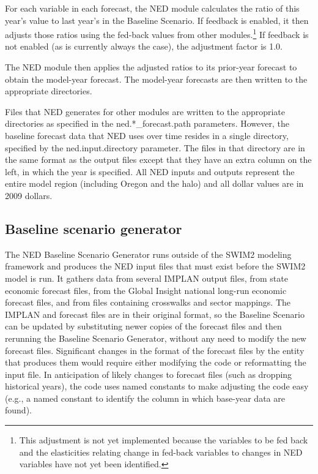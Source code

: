 For each variable in each forecast, the NED module calculates the ratio of this year's value to last year's in the Baseline Scenario. If feedback is enabled, it then adjusts those ratios using the fed-back values from other modules.\footnote{This adjustment is not yet implemented because the variables to be fed back and the elasticities relating change in fed-back variables to changes in NED variables have not yet been identified.} If feedback is not enabled (as is currently always the case), the adjustment factor is 1.0.

The NED module then applies the adjusted ratios to its prior-year forecast to obtain the model-year forecast. The model-year forecasts are then written to the appropriate directories.

Files that NED generates for other modules are written to the appropriate directories as specified in the ned.*\_forecast.path parameters. However, the baseline forecast data that NED uses over time resides in a single directory, specified by the ned.input.directory parameter. The files in that directory are in the same format as the output files except that they have an extra column on the left, in which the year is specified. All NED inputs and outputs represent the entire model region (including Oregon and the halo) and all dollar values are in 2009 dollars.

\subsection{Baseline scenario generator}
The NED Baseline Scenario Generator runs outside of the SWIM2 modeling framework and produces the NED input files that must exist before the SWIM2 model is run. It gathers data from several IMPLAN output files, from state economic forecast files, from the Global Insight national long-run economic forecast files, and from files containing crosswalks and sector mappings. The IMPLAN and forecast files are in their original format, so the Baseline Scenario can be updated by substituting newer copies of the forecast files and then rerunning the Baseline Scenario Generator, without any need to modify the new forecast files. Significant changes in the format of the forecast files by the entity that produces them would require either modifying the code or reformatting the input file. In anticipation of likely changes to forecast files (such as dropping historical years), the code uses named constants to make adjusting the code easy (e.g., a named constant to identify the column in which base-year data are found).

